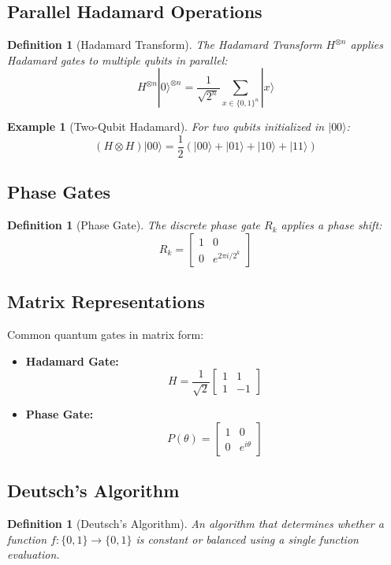 \documentclass{article}
\newtheorem{definition}[theorem]{Definition}
\newtheorem{example}[theorem]{Example}
\begin{document}
\subsection{Parallel Hadamard Operations}
\begin{definition}[Hadamard Transform]
The Hadamard Transform \(H^{\otimes n}\) applies Hadamard gates to multiple qubits in parallel:
\[
H^{\otimes n} |0\rangle^{\otimes n} = \frac{1}{\sqrt{2^n}} \sum_{x \in \{0,1\}^n} |x\rangle
\]
\end{definition}

\begin{example}[Two-Qubit Hadamard]
For two qubits initialized in \(|00\rangle\):
\[
(H \otimes H) |00\rangle = \frac{1}{2} (|00\rangle + |01\rangle + |10\rangle + |11\rangle)
\]
\end{example}

\subsection{Phase Gates}
\begin{definition}[Phase Gate]
The discrete phase gate \(R_k\) applies a phase shift:
\[
R_k =
\begin{bmatrix}
1 & 0 \\
0 & e^{2\pi i / 2^k}
\end{bmatrix}
\]
\end{definition}

\subsection{Matrix Representations}
\begin{conceptbox}
Common quantum gates in matrix form:
\begin{itemize}
    \item \textbf{Hadamard Gate:}
    \[
    H = \frac{1}{\sqrt{2}}
    \begin{bmatrix}
    1 & 1 \\
    1 & -1
    \end{bmatrix}
    \]
    \item \textbf{Phase Gate:}
    \[
    P(\theta) =
    \begin{bmatrix}
    1 & 0 \\
    0 & e^{i\theta}
    \end{bmatrix}
    \]
\end{itemize}
\end{conceptbox}

\subsection{Deutsch's Algorithm}
\begin{definition}[Deutsch's Algorithm]
An algorithm that determines whether a function \(f: \{0,1\} \to \{0,1\}\) is constant or balanced using a single function evaluation.
\end{definition}
\end{document}

